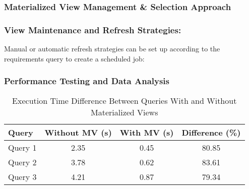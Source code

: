 \subsubsection{Materialized View Management \& Selection Approach}
\subsubsection{View Maintenance and Refresh Strategies:} Manual or automatic refresh strategies can be set up according to the requirements query to create a scheduled job:



\subsubsection{Performance Testing and Data Analysis}


 


\begin{table}[h!]
    \centering
    \begin{tabular}{@{}lccc@{}}
        \toprule
        \textbf{Query} & \textbf{Without MV (s)} & \textbf{With MV (s)} & \textbf{Difference (\%)} \\ \midrule
        Query 1        & 2.35                   & 0.45                 & 80.85                   \\
        Query 2        & 3.78                   & 0.62                 & 83.61                   \\
        Query 3        & 4.21                   & 0.87                 & 79.34                   \\ \bottomrule
    \end{tabular}
    \caption{Execution Time Difference Between Queries With and Without Materialized Views}
    \label{tab:performance}
\end{table}


